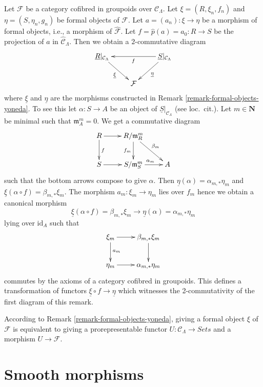 \begin{remark}
\label{remark-formal-objects-yoneda-map}
Let $\mathcal{F}$ be a category cofibred in groupoids over
$\mathcal{C}_\Lambda$. Let $\xi = (R, \xi_n, f_n)$ and
$\eta = (S, \eta_n, g_n)$ be formal objects of $\mathcal{F}$.
Let $a = (a_n) : \xi \to \eta$ be a morphism of formal objects, i.e.,
a morphism of $\widehat{\mathcal{F}}$. Let
$f = \widehat{p}(a) = a_0 : R \to S$ be the projection of $a$ in
$\widehat{\mathcal{C}}_\Lambda$. Then we obtain a $2$-commutative
diagram
$$
\xymatrix{
\underline{R}|_{\mathcal{C}_\Lambda} \ar[rd]_{\underline{\xi}} & &
\underline{S}|_{\mathcal{C}_\Lambda} \ar[ll]^f \ar[ld]^{\underline{\eta}} \\
& \mathcal{F}
}
$$
where $\underline{\xi}$ and $\underline{\eta}$ are the morphisms
constructed in
Remark \ref{remark-formal-objects-yoneda}.
To see this let $\alpha : S \to A$ be an object of
$\underline{S}|_{\mathcal{C}_\Lambda}$ (see loc.\ cit.).
Let $m \in \mathbf{N}$ be minimal such that $\mathfrak m_A^m = 0$.
We get a commutative diagram
$$
\xymatrix{
R \ar[d]^f \ar[r] & R/\mathfrak m_R^m \ar[d]_{f_m} \ar[rd]^{\beta_m} \\
S \ar[r] & S/\mathfrak m_S^m \ar[r]^{\alpha_m} & A
}
$$
such that the bottom arrows compose to give $\alpha$.
Then $\underline{\eta}(\alpha) = \alpha_{m, *}\eta_m$ and
$\underline{\xi}(\alpha \circ f) = \beta_{m, *}\xi_m$. The morphism
$a_m : \xi_m \to \eta_m$ lies over $f_m$ hence we obtain a canonical
morphism
$$
\underline{\xi}(\alpha \circ f) = \beta_{m, *}\xi_m
\longrightarrow
\underline{\eta}(\alpha) = \alpha_{m, *}\eta_m
$$
lying over $\text{id}_A$ such that
$$
\xymatrix{
\xi_m \ar[r] \ar[d]^{a_m} &  \beta_{m, *}\xi_m \ar[d] \\
\eta_m \ar[r] &  \alpha_{m, *}\eta_m
}
$$
commutes by the axioms of a category cofibred in groupoids. This defines
a transformation of functors $\underline{\xi} \circ f \to \underline{\eta}$
which witnesses the 2-commutativity of the first diagram of this remark.
\end{remark}

\begin{remark}
\label{remark-spell-out-formal-object}
According to Remark \ref{remark-formal-objects-yoneda}, giving a formal object
$\xi$ of $\mathcal{F}$ is equivalent to giving a prorepresentable functor
$U : \mathcal{C}_\Lambda \to \textit{Sets}$ and a morphism
$U \to \mathcal{F}$.
\end{remark}




\section{Smooth morphisms}
\label{section-smooth-morphisms}

